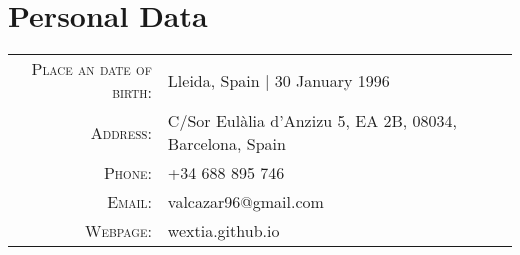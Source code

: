 \section{Personal Data}
\begin{center}
\begin{tabular}{ r l }
	\textsc{Place an date of birth:} 	& Lleida, Spain | 30 January 1996 	\\
	\textsc{Address:}			& C/Sor Eulàlia d'Anzizu 5, EA 2B, 08034, Barcelona, Spain \\
	\textsc{Phone:}				& +34 688 895 746 			\\
	\textsc{Email:}				& valcazar96@gmail.com 			\\
	\textsc{Webpage:}			& wextia.github.io			\\
\end{tabular}
\end{center}
